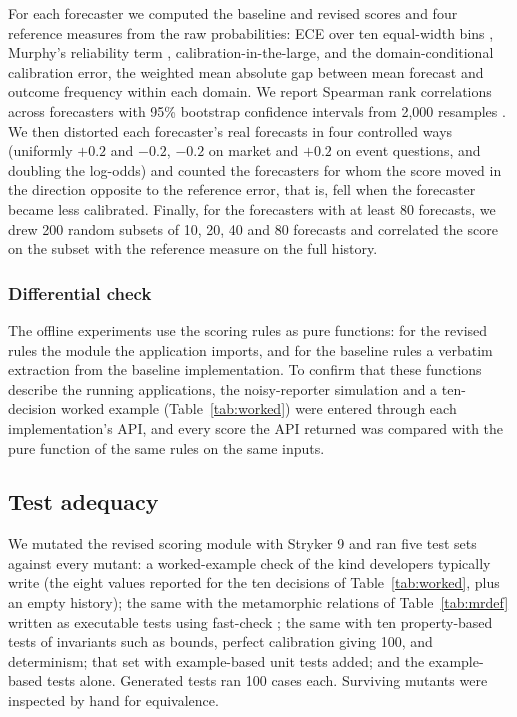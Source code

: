 \documentclass[12pt,a4paper]{article}
\begin{document}
For each forecaster we computed the baseline and revised scores and four reference measures from the raw probabilities: ECE over ten equal-width bins \cite{naeini2015}, Murphy's reliability term \cite{murphy1973}, calibration-in-the-large, and the domain-conditional calibration error, the weighted mean absolute gap between mean forecast and outcome frequency within each domain. We report Spearman rank correlations across forecasters with 95\% bootstrap confidence intervals from 2,000 resamples \cite{efron1993}. We then distorted each forecaster's real forecasts in four controlled ways (uniformly $+0.2$ and $-0.2$, $-0.2$ on market and $+0.2$ on event questions, and doubling the log-odds) and counted the forecasters for whom the score moved in the direction opposite to the reference error, that is, fell when the forecaster became less calibrated. Finally, for the \LenForecasters{} forecasters with at least 80 forecasts, we drew 200 random subsets of 10, 20, 40 and 80 forecasts and correlated the score on the subset with the reference measure on the full history.

\subsubsection{Differential check}

The offline experiments use the scoring rules as pure functions: for the revised rules the module the application imports, and for the baseline rules a verbatim extraction from the baseline implementation. To confirm that these functions describe the running applications, the noisy-reporter simulation and a ten-decision worked example (Table~\ref{tab:worked}) were entered through each implementation's API, and every score the API returned was compared with the pure function of the same rules on the same inputs.

\subsection{Test adequacy}

We mutated the revised scoring module with Stryker 9 \cite{stryker} and ran five test sets against every mutant: a worked-example check of the kind developers typically write (the eight values reported for the ten decisions of Table~\ref{tab:worked}, plus an empty history); the same with the metamorphic relations of Table~\ref{tab:mrdef} written as executable tests using fast-check \cite{fastcheck}; the same with ten property-based tests of invariants such as bounds, perfect calibration giving 100, and determinism; that set with example-based unit tests added; and the example-based tests alone. Generated tests ran 100 cases each. Surviving mutants were inspected by hand for equivalence.
\end{document}
